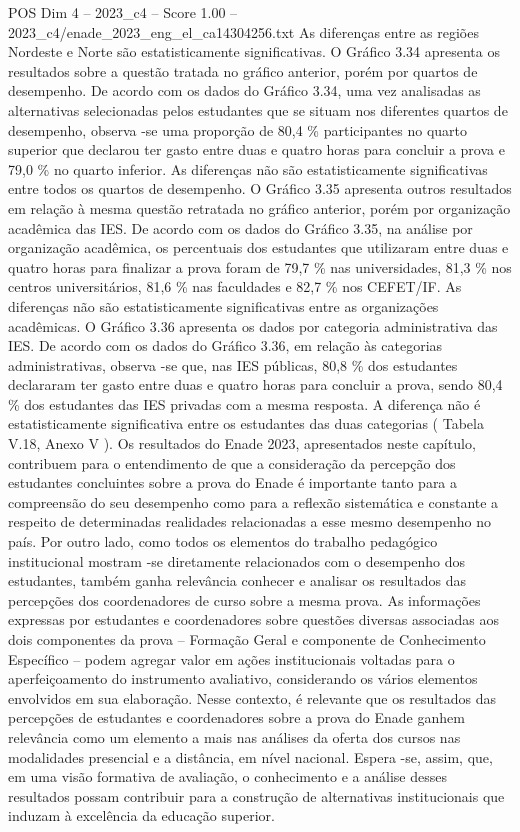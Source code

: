 \begin{textsample}{POS Dim 4 – 2023\_c4 – Score 1.00 – 2023\_c4/enade\_2023\_eng\_el\_ca14304256.txt}
As diferenças entre as regiões Nordeste e Norte são estatisticamente significativas.
O Gráfico 3.34 apresenta os resultados sobre a questão tratada no gráfico anterior, porém por quartos de desempenho.
De acordo com os dados do Gráfico 3.34, uma vez analisadas as alternativas selecionadas pelos estudantes que se situam nos diferentes quartos de desempenho, observa -se uma proporção de 80,4 \% participantes no quarto superior que declarou ter gasto entre duas e quatro horas para concluir a prova e 79,0 \% no quarto inferior.
As diferenças não são estatisticamente significativas entre todos os quartos de desempenho.
O Gráfico 3.35 apresenta outros resultados em relação à mesma questão retratada no gráfico anterior, porém por organização acadêmica das IES.
De acordo com os dados do Gráfico 3.35, na análise por organização acadêmica, os percentuais dos estudantes que utilizaram entre duas e quatro horas para finalizar a prova foram de 79,7 \% nas universidades, 81,3 \% nos centros universitários, 81,6 \% nas faculdades e 82,7 \% nos CEFET/IF.
As diferenças não são estatisticamente significativas entre as organizações acadêmicas.
O Gráfico 3.36 apresenta os dados por categoria administrativa das IES.
De acordo com os dados do Gráfico 3.36, em relação às categorias administrativas, observa -se que, nas IES públicas, 80,8 \% dos estudantes declararam ter gasto entre duas e quatro horas para concluir a prova, sendo 80,4 \% dos estudantes das IES privadas com a mesma resposta.
A diferença não é estatisticamente significativa entre os estudantes das duas categorias ( Tabela V.18, Anexo V ).
Os resultados do Enade 2023, apresentados neste capítulo, contribuem para o entendimento de que a consideração da percepção dos estudantes concluintes sobre a prova do Enade é importante tanto para a compreensão do seu desempenho como para a reflexão sistemática e constante a respeito de determinadas realidades relacionadas a esse mesmo desempenho no país.
Por outro lado, como todos os elementos do trabalho pedagógico institucional mostram -se diretamente relacionados com o desempenho dos estudantes, também ganha relevância conhecer e analisar os resultados das percepções dos coordenadores de curso sobre a mesma prova.
As informações expressas por estudantes e coordenadores sobre questões diversas associadas aos dois componentes da prova – Formação Geral e componente de Conhecimento Específico – podem agregar valor em ações institucionais voltadas para o aperfeiçoamento do instrumento avaliativo, considerando os vários elementos envolvidos em sua elaboração.
Nesse contexto, é relevante que os resultados das percepções de estudantes e coordenadores sobre a prova do Enade ganhem relevância como um elemento a mais nas análises da oferta dos cursos nas modalidades presencial e a distância, em nível nacional.
Espera -se, assim, que, em uma visão formativa de avaliação, o conhecimento e a análise desses resultados possam contribuir para a construção de alternativas institucionais que induzam à excelência da educação superior.

\end{textsample}
